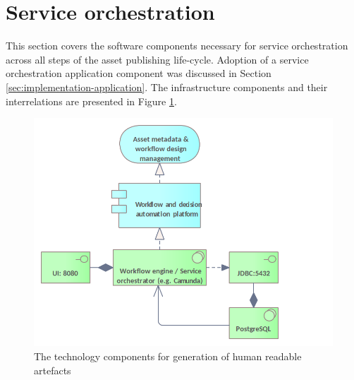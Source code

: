 	
	
	
	
	\section{Service orchestration}
	\label{sec:technology-view-orchestration}
	
	This section covers the software components necessary for service orchestration across all steps of the asset publishing life-cycle. Adoption of a service orchestration application component was discussed in Section \ref{sec:implementation-application}. The infrastructure components and their interrelations are presented in Figure \ref{fig:technology-view-orchestration}. 
	
	\begin{figure}[!h]
		\centering
		\includegraphics[width=.8\textwidth]{images/infra-setup/orchestration.png}
		\caption{The technology components for generation of human readable artefacts}
		\label{fig:technology-view-orchestration}
	\end{figure}

